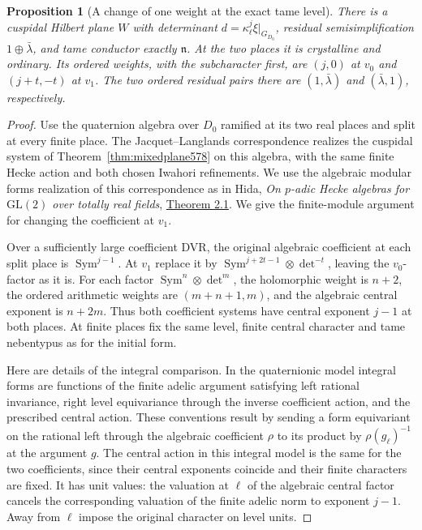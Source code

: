 \documentclass[a4paper,11pt]{article}
\newtheorem{proposition}{Proposition}[section]
\theoremstyle{definition}
\theoremstyle{remark}
\numberwithin{equation}{section}
\begin{document}
\begin{proposition}[A change of one weight at the exact tame level]
\leavevmode\label{prop:weightchange579}
There is a cuspidal Hilbert plane \(W\) with determinant
\(d=\kappa_\ell^j\xi|_{G_{D_0}}\), residual semisimplification
\(1\oplus\bar\lambda\), and tame conductor exactly
\(\mathfrak n\). At the two places it is crystalline and
ordinary. Its ordered weights, with the subcharacter first,
are \((j,0)\) at \(v_0\) and \((j+t,-t)\) at \(v_1\).
The two ordered residual pairs there are \((1,\bar\lambda)\)
and \((\bar\lambda,1)\), respectively.
\end{proposition}
\begin{proof}
Use the quaternion algebra over \(D_0\) ramified at its two
real places and split at every finite place. The
Jacquet--Langlands correspondence realizes the cuspidal
system of Theorem~\ref{thm:mixedplane578} on this algebra,
with the same finite Hecke action and both chosen Iwahori
refinements. We use the algebraic modular forms realization
of this correspondence as in Hida, \emph{On \(p\)-adic Hecke
algebras for \(\mathrm{GL}(2)\) over totally real fields},
\href{https://web.iwr.uni-heidelberg.de/fileadmin/groups/arithgeo/templates/data/Hauptseminare/Literature-WS13/hida-quat_AF_and_JL.pdf}
{Theorem 2.1}. We give the finite-module argument for changing
the coefficient at \(v_1\).

Over a sufficiently large coefficient DVR, the original
algebraic coefficient at each split place is
\(\operatorname{Sym}^{j-1}\). At \(v_1\) replace it by
\(\operatorname{Sym}^{j+2t-1}\otimes\det^{-t}\), leaving
the \(v_0\)-factor as it is. For each factor
\(\operatorname{Sym}^{n}\otimes\det^m\), the holomorphic
weight is \(n+2\), the ordered arithmetic weights are
\((m+n+1,m)\), and the algebraic central exponent is
\(n+2m\). Thus both coefficient systems have central
exponent \(j-1\) at both places. At finite places fix the
same level, finite central character and tame nebentypus
as for the initial form.

Here are details of the integral comparison. In the
quaternionic model integral forms are functions of the
finite adelic argument satisfying left rational invariance,
right level equivariance through the inverse coefficient
action, and the prescribed central action. These conventions
result by sending a form equivariant on the rational left
through the algebraic coefficient \(\rho\) to its product
by \(\rho(g_\ell)^{-1}\) at the argument \(g\). The central
action in this integral model is the same for the two
coefficients, since their central exponents coincide and
their finite characters are fixed. It has unit values:
the valuation at \(\ell\) of the algebraic central factor
cancels the corresponding valuation of the finite adelic
norm to exponent \(j-1\). Away from \(\ell\) impose the
original character on level units.


\end{proof}
\end{document}
